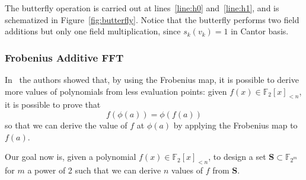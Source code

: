     \begin{algorithm2e}[H]
    \label{alg:lchfft}
    \caption{Lin-Chung-Han FFT}

    \end{algorithm2e}
    The butterfly operation is carried out at lines~\ref{line:h0} and~\ref{line:h1}, and
    is schematized in Figure~\ref{fig:butterfly}. Notice that the butterfly performs two field additions but only one field multiplication,
    since $s_k(v_k) = 1$ in Cantor basis.

    

    \subsubsection{Frobenius Additive FFT}
    In~\cite{DBLP:conf/issac/HoevenL17} the authors showed that, by using the Frobenius map, it is possible
    to derive more values of polynomials from less evaluation points: given $f(x) \in \mathds{F}_2[x]_{<n}$,
    it is possible to prove that
    \begin{equation}
        f(\phi(a)) = \phi(f(a))
    \end{equation}
    so that we can derive the value of $f$ at $\phi(a)$ by applying the Frobenius map to $f(a)$.
    
    Our goal now is, given a polynomial $f(x) \in \mathds{F}_2[x]_{<n}$, to design a set $\mathbf{S} \subset \mathds{F}_{2^m}$
    for $m$ a power of 2 such that we can derive $n$ values of $f$ from $\mathbf{S}$.\
